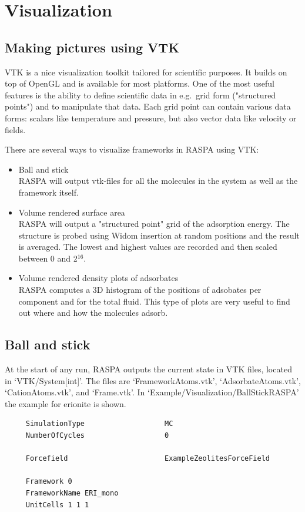 \chapter{Visualization}

\section{Making pictures using VTK}

VTK is a nice visualization toolkit tailored for scientific purposes. It builds on top of OpenGL and is available
for most platforms. One of the most useful features is the ability to define scientific data in e.g.\
grid form ("structured points") and to manipulate that data. Each grid point can contain various data forms:
scalars like temperature and pressure, but also vector data like velocity or fields.

There are several ways to visualize frameworks in RASPA using VTK:
\begin{itemize}
  \item{Ball and stick}\\
  RASPA will output vtk-files for all the molecules in the system as well as the framework itself.
  \item{Volume rendered surface area}\\
  RASPA will output a "structured point" grid of the adsorption energy. The structure is probed using Widom insertion
  at random positions and the result is averaged. The lowest and highest values are recorded and then scaled between
  0 and 2$^{16}$.
  \item{Volume rendered density plots of adsorbates}\\
  RASPA computes a 3D histogram of the positions of adsobates per component and for the total fluid.
  This type of plots are very useful to find out where and how the molecules adsorb.
\end{itemize}

\section{Ball and stick}

At the start of any run, RASPA outputs the current state in VTK files, located in `VTK/System[int]'. The files
are `FrameworkAtoms.vtk', `AdsorbateAtoms.vtk', `CationAtoms.vtk', and `Frame.vtk'. In 
`Example/Visualization/BallStickRASPA' the example for erionite is shown.
\begin{verbatim}
     SimulationType                   MC
     NumberOfCycles                   0

     Forcefield                       ExampleZeolitesForceField

     Framework 0
     FrameworkName ERI_mono
     UnitCells 1 1 1
\end{verbatim}

